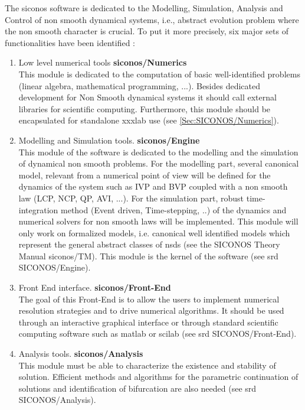 The \ac{siconos} software is dedicated to the Modelling, Simulation, Analysis and Control of non smooth dynamical systems, i.e., abstract evolution problem where the non smooth character is crucial. To put it more  precisely, six major sets of functionalities have been identified :
\begin{enumerate}
\item Low level numerical tools \textbf{\ac{siconos}/Numerics} \\
This module is dedicated to the computation of basic well-identified problems (linear algebra, mathematical programming, ...). Besides dedicated development for Non Smooth dynamical systems it should call external libraries for scientific computing. Furthermore, this module should be encapsulated for standalone \ac{xxxlab} use (see \ref{Sec:SICONOS/Numerics}).

\item Modelling and Simulation tools. \textbf{\ac{siconos}/Engine} \\
  This module of the software is dedicated to the modelling and the simulation of  dynamical non smooth problems. For the modelling part, several canonical model, relevant from a numerical point of view will be defined for the dynamics of the system such as IVP and BVP coupled with a non smooth law (LCP, NCP, QP, AVI, ...). For the simulation part, robust time-integration method (Event driven, Time-stepping, ..) of the dynamics  and numerical solvers for non smooth laws  will be implemented. This module will only work on formalized models, i.e. canonical well identified models which represent the general abstract classes of \ac{nsds} (see the \ac{SICONOS} Theory Manual \textsf{\ac{siconos}/TM}). This module is the kernel of the software (see \ac{srd} SICONOS/Engine).

\item Front End interface. \textbf{\ac{siconos}/Front-End} \\
  The goal of this Front-End is to allow the users to implement  numerical resolution strategies and to drive numerical algorithms. It should be used through an interactive graphical interface or through standard scientific computing software such as \ac{matlab} or \ac{scilab} (see \ac{srd} SICONOS/Front-End). 
\item Analysis tools. \textbf{\ac{siconos}/Analysis} \\
 This module must be able to characterize the existence and stability of solution. Efficient methods and algorithms for the parametric continuation of solutions and identification of bifurcation are also needed (see \ac{srd} SICONOS/Analysis).


\end{enumerate}
